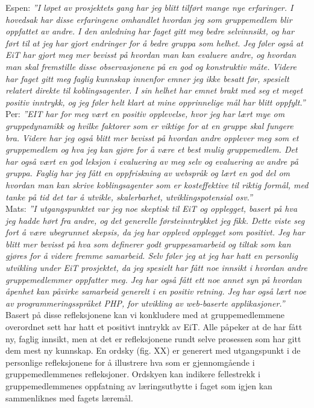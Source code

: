 Espen: \textit{''I løpet av prosjektets gang har jeg blitt tilført mange nye erfaringer. I hovedsak har disse erfaringene omhandlet hvordan jeg som gruppemedlem blir oppfattet av andre. I den anledning har faget gitt meg bedre selvinnsikt, og har ført til at jeg har gjort endringer for å bedre gruppa som helhet. Jeg føler også at EiT har gjort meg mer bevisst på hvordan man kan evaluere andre, og hvordan man skal fremstille disse observasjonene på en god og konstruktiv måte. Videre har faget gitt meg faglig kunnskap innenfor emner jeg ikke besatt før, spesielt relatert direkte til koblingsagenter. I sin helhet har emnet brakt med seg et meget positiv inntrykk, og jeg føler helt klart at mine opprinnelige mål har blitt oppfylt.''}\\

Per: \textit{''EIT har for meg vært en positiv opplevelse, hvor jeg har lært mye om gruppedynamikk og hvilke faktorer som er viktige for at en gruppe skal fungere bra. Videre har jeg også blitt mer bevisst på hvordan andre opplever meg som et gruppemedlem og hva jeg kan gjøre for å være et best mulig gruppemedlem. Det har også vært en god leksjon i evaluering av meg selv og evaluering av andre på gruppa. Faglig har jeg fått en oppfriskning av webspråk og lært en god del om hvordan man kan skrive koblingsagenter som er kosteffektive til riktig formål, med tanke på tid det tar å utvikle, skalerbarhet, utviklingspotensial osv.''}\\

Mats: \textit{''I utgangspunktet var jeg noe skeptisk til EiT og opplegget, basert på hva jeg hadde hørt fra andre, og det generelle førsteinntrykket jeg fikk. Dette viste seg fort å være ubegrunnet skepsis, da jeg har opplevd opplegget som positivt. Jeg har blitt mer bevisst på hva som definerer godt gruppesamarbeid og tiltak som kan gjøres for å videre fremme samarbeid.  Selv føler jeg at jeg har hatt en personlig utvikling under EiT prosjektet, da jeg spesielt har fått noe innsikt i hvordan andre gruppemedlemmer oppfatter meg. Jeg har også fått ett noe annet syn på hvordan åpenhet kan påvirke samarbeid generelt i en positiv retning. Jeg har også lært noe av programmeringsspråket PHP, for utvikling av web-baserte applikasjoner.''}\\

Basert på disse refleksjonene kan vi konkludere med at gruppemedlemmene overordnet sett har hatt et positivt inntrykk av EiT. Alle påpeker at de har fått ny, faglig innsikt, men at det er refleksjonene rundt selve prosessen som har gitt dem mest ny kunnskap. En ordsky (fig. XX) er generert med utgangspunkt i de personlige refleksjonene for å illustrere hva som er gjennomgående i gruppemedlemmenes refleksjoner. Ordskyen kan indikere fellestrekk i gruppemedlemmenes oppfatning av læringsutbytte i faget som igjen kan sammenliknes med fagets læremål.\\

